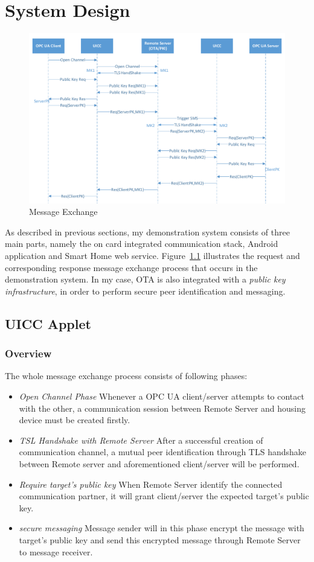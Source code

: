 \chapter{System Design}

\begin{figure}[!htbp]
	\centering
	\includegraphics[width=1\textwidth]{whole-structure}
		\caption{Message Exchange}
	\label{fig:whole-structure}
\end{figure}

As described in previous sections, my demonstration system consists of three main parts, namely the on card integrated communication stack, Android application and Smart Home web service. Figure~\ref{fig:whole-structure} illustrates the request and corresponding response message exchange process that occurs in the demonstration system. In my case, OTA is also integrated with a \emph{public key infrastructure},  in order to perform secure peer identification and messaging.


\section{UICC Applet}
\subsection{Overview}
The whole message exchange process consists of following phases:
\begin{itemize}
\item \emph{Open Channel Phase} Whenever a OPC UA client/server attempts to contact with the other, a communication session between Remote Server and housing device must be created firstly.
\item \emph{TSL Handshake with Remote Server} After a successful creation of communication channel, a mutual peer identification through TLS handshake between Remote server and aforementioned client/server will be performed.
\item \emph{Require target's public key} When Remote Server identify the connected communication partner, it will grant client/server the expected target's public key. 
\item \emph{secure messaging} Message sender will in this phase encrypt the message with target's public key and send this encrypted message through Remote Server to message receiver. 
\end{itemize}
